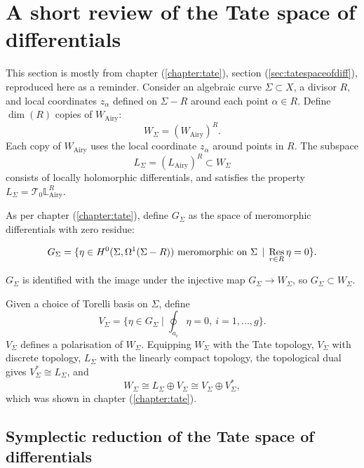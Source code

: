     
    
    
    
    \section{A short review of the Tate space of differentials}
    
    This section is mostly from chapter (\ref{chapter:tate}), section (\ref{sec:tatespaceofdiff}), reproduced here as a reminder. Consider an algebraic curve \(\Sigma \subset X\), a divisor \(R\), and local coordinates \(z_\alpha\) defined on \( \Sigma - R\) around each point \(\alpha \in R\). Define \( \dim(R)\) copies of \(W_{\mathrm{Airy}}\): 
    \[ W_\Sigma =(W_{\text{Airy}})^R.\]  
    Each copy of \(W_{\text{Airy}}\) uses the local coordinate \(z_\alpha\) around points in \(R\). The subspace 
    \[L_\Sigma =(L_{\mathrm{Airy}})^R \subset W_\Sigma \] consists of locally holomorphic differentials, and satisfies the property \( L_\Sigma =\mathcal{T}_0 \mathbb{L}^R_{\mathrm{Airy}}\). 
    
    As per chapter (\ref{chapter:tate}), define \(G_\Sigma\) as the space of meromorphic differentials with zero residue:
    \begin{defn}[\(G_\Sigma\)]
    \begin{equation} 
     \label{eqn:gsigma}
         G_\Sigma=\{ \eta\in H^0(\Sigma,\Omega^1(\Sigma-R)) \text{\ meromorphic on }\Sigma \, \mid\,\Res_{r\in R}\eta=0\}.
    \end{equation}
    \end{defn}
    \(G_\Sigma\) is identified with the image under the injective map \(G_\Sigma \rightarrow W_\Sigma\), so \(G_\Sigma \subset W_\Sigma\). 
    
    Given a choice of Torelli basis on \(\Sigma\), define
    \begin{equation} \label{vsigma}
        V_\Sigma=\{ \eta\in G_\Sigma\mid\oint_{a_i}\eta=0,\ i=1,...,g\}.
    \end{equation}
    \( V_\Sigma \) defines a polarisation of \(W_\Sigma\). Equipping \(W_\Sigma\) with the Tate topology, \(V_\Sigma\) with discrete topology, \(L_\Sigma\) with the linearly compact topology, the topological dual gives \( V_\Sigma^* \cong L_\Sigma \), and 
    \[ W_\Sigma \cong L_\Sigma \oplus V_\Sigma \cong V_\Sigma \oplus V_\Sigma^*,\] which was shown in chapter (\ref{chapter:tate}).

    \subsection{Symplectic reduction of the Tate space of differentials}

